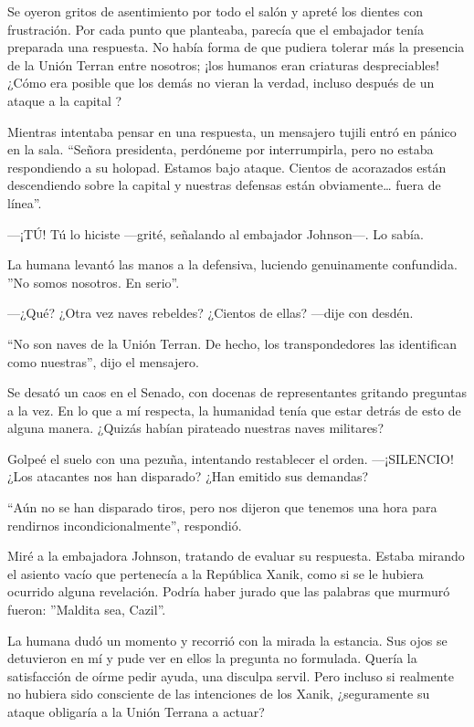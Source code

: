 Se oyeron gritos de asentimiento por todo el salón y apreté los dientes con frustración. Por cada punto que planteaba, parecía que el embajador tenía preparada una respuesta. No había forma de que pudiera tolerar más la presencia de la Unión Terran entre nosotros; ¡los humanos eran criaturas despreciables! ¿Cómo era posible que los demás no vieran la verdad, incluso después de un ataque a la capital ?

Mientras intentaba pensar en una respuesta, un mensajero tujili entró en pánico en la sala. ``Señora presidenta, perdóneme por interrumpirla, pero no estaba respondiendo a su holopad. Estamos bajo ataque. Cientos de acorazados están descendiendo sobre la capital y nuestras defensas están obviamente… fuera de línea''.

—¡TÚ! Tú lo hiciste —grité, señalando al embajador Johnson—. Lo sabía.

La humana levantó las manos a la defensiva, luciendo genuinamente confundida. ''No somos nosotros. En serio''.

—¿Qué? ¿Otra vez naves rebeldes? ¿Cientos de ellas? —dije con desdén.

``No son naves de la Unión Terran. De hecho, los transpondedores las identifican como nuestras'', dijo el mensajero.

Se desató un caos en el Senado, con docenas de representantes gritando preguntas a la vez. En lo que a mí respecta, la humanidad tenía que estar detrás de esto de alguna manera. ¿Quizás habían pirateado nuestras naves militares?

Golpeé el suelo con una pezuña, intentando restablecer el orden. —¡SILENCIO! ¿Los atacantes nos han disparado? ¿Han emitido sus demandas?

``Aún no se han disparado tiros, pero nos dijeron que tenemos una hora para rendirnos incondicionalmente'', respondió.

Miré a la embajadora Johnson, tratando de evaluar su respuesta. Estaba mirando el asiento vacío que pertenecía a la República Xanik, como si se le hubiera ocurrido alguna revelación. Podría haber jurado que las palabras que murmuró fueron: ''Maldita sea, Cazil''.

La humana dudó un momento y recorrió con la mirada la estancia. Sus ojos se detuvieron en mí y pude ver en ellos la pregunta no formulada. Quería la satisfacción de oírme pedir ayuda, una disculpa servil. Pero incluso si realmente no hubiera sido consciente de las intenciones de los Xanik, ¿seguramente su ataque obligaría a la Unión Terrana a actuar?

